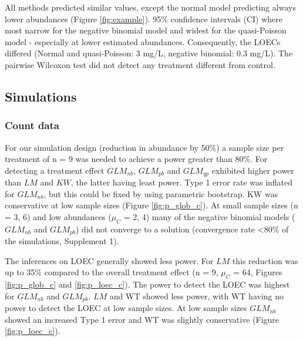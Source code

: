 \documentclass{scrartcl}
\begin{document}
All methods predicted similar values, except the normal model predicting always lower abundances (Figure \ref{fig:example}). 
95\% confidence intervals (CI) where most narrow for the negative binomial model and widest for the quasi-Poisson model - especially at lower estimated abundances.
Consequently, the LOECs differed (Normal and quasi-Poisson: 3 mg/L, negative binomial: 0.3 mg/L).
The pairwise Wilcoxon test did not detect any treatment different from control.


\subsection{Simulations}
\subsubsection{Count data}
For our simulation design (reduction in abundance by 50\%) a sample size per treatment of n = 9 was needed to achieve a power greater than 80\%.
For detecting a treatment effect $GLM_{nb}$, $GLM_{pb}$ and $GLM_{qp}$ exhibited higher power than $LM$ and $KW$, the latter having least power.
Type 1 error rate was inflated for $GLM_{nb}$, but this could be fixed by using parametric bootstrap.
KW was conservative at low sample sizes (Figure \ref{fig:p_glob_c}).
At small sample sizes (n = {3, 6}) and low abundances ($\mu_C$ = {2, 4}) many of the negative binomial models ($GLM_{nb}$ and $GLM_{pb}$) did not converge to a solution (convergence rate \textless 80\% of the simulations, Supplement 1). 

The inferences on LOEC generally showed less power.
For $LM$ this reduction was up to 35\% compared to the overall treatment effect (n = 9, $\mu_C$ = 64, Figures \ref{fig:p_glob_c} and \ref{fig:p_loec_c}).
The power to detect the LOEC was highest for $GLM_{nb}$ and $GLM_{pb}$. $LM$ and WT showed less power, with WT having no power to detect the LOEC at low sample sizes.
At low sample sizes $GLM_{nb}$ showed an increased Type 1 error and WT was slightly conservative (Figure \ref{fig:p_loec_c}).
\end{document}
